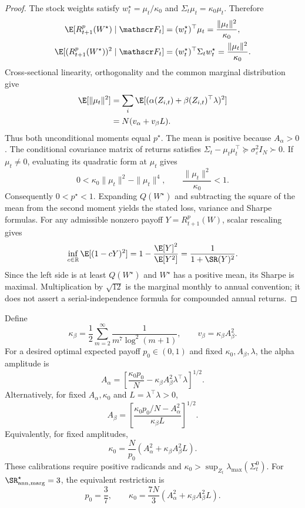 \begin{proof}
The stock weights satisfy $w_t^\star=\mu_t/\kappa_0$ and
$\Sigma_t\mu_t=\kappa_0\mu_t$. Therefore
\begin{align*}
\E[R^p_{t+1}(W^\star)\mid\mathscr F_t]
&=(w_t^\star)^\top\mu_t=\frac{\|\mu_t\|^2}{\kappa_0},\\
\E[(R^p_{t+1}(W^\star))^2\mid\mathscr F_t]
&=(w_t^\star)^\top\Sigma_tw_t^\star=\frac{\|\mu_t\|^2}{\kappa_0}.
\end{align*}
Cross-sectional linearity, orthogonality and the common marginal distribution give
\begin{align*}
\E[\|\mu_t\|^2]
&=\sum_i\E[(\alpha(Z_{i,t})+\beta(Z_{i,t})^\top\lambda)^2]\\
&=N(v_\alpha+v_\beta L).
\end{align*}
Thus both unconditional moments equal $p^\star$. The mean is positive because
$A_\alpha>0$. The conditional covariance matrix of returns satisfies
$\Sigma_t-\mu_t\mu_t^\top\succeq\sigma_\varepsilon^2I_N\succ0$.
If $\mu_t\neq0$, evaluating its quadratic form at $\mu_t$ gives
\[
0<\kappa_0\|\mu_t\|^2-\|\mu_t\|^4,
\qquad\frac{\|\mu_t\|^2}{\kappa_0}<1.
\]
Consequently $0<p^\star<1$. Expanding $Q(W^\star)$ and subtracting the
square of the mean from the second moment yields the stated loss, variance
and Sharpe formulas.
For any admissible nonzero payoff $Y=R^p_{t+1}(W)$, scalar rescaling gives
\[
\inf_{c\in\mathbb R}\E[(1-cY)^2]
=1-\frac{\E[Y]^2}{\E[Y^2]}
=\frac1{1+\SR(Y)^2}.
\]
Since the left side is at least $Q(W^\star)$ and $W^\star$ has a positive mean,
its Sharpe is maximal. Multiplication by $\sqrt{12}$ is the marginal monthly
to annual convention; it does not assert a serial-independence formula for
compounded annual returns.
\end{proof}
\begin{proposition}
\label{prop:mc_calibration}
Define
\[
\kappa_\beta=\frac12\sum_{m=2}^\infty\frac1{m^7\log^2(m+1)},
\qquad v_\beta=\kappa_\beta A_\beta^2.
\]
For a desired optimal expected payoff $p_0\in(0,1)$ and fixed
$\kappa_0,A_\beta,\lambda$, the alpha amplitude is
\[
A_\alpha=\left[\frac{\kappa_0p_0}{N}
-\kappa_\beta A_\beta^2\lambda^\top\lambda\right]^{1/2}.
\]
Alternatively, for fixed $A_\alpha,\kappa_0$ and $L=\lambda^\top\lambda>0$,
\[
A_\beta=\left[
\frac{\kappa_0p_0/N-A_\alpha^2}{\kappa_\beta L}
\right]^{1/2}.
\]
Equivalently, for fixed amplitudes,
\[
\kappa_0=\frac{N}{p_0}
\left(A_\alpha^2+\kappa_\beta A_\beta^2L\right).
\]
These calibrations require positive radicands and
$\kappa_0>\sup_{Z_t}\lambda_{\max}(\Sigma_t^0)$.
For $\SR_{\mathrm{ann,marg}}^\star=3$, the equivalent restriction is
\[
p_0=\frac37,\qquad
\kappa_0=\frac{7N}{3}
\left(A_\alpha^2+\kappa_\beta A_\beta^2L\right).
\]
\end{proposition}
